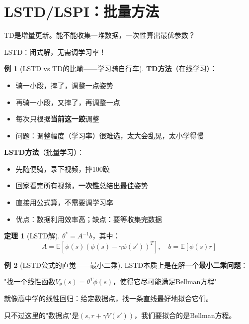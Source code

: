 \documentclass[11pt,a4paper]{article}
\theoremstyle{definition}
\newtheorem{example}{例}[section]
\newtheorem{theorem}{定理}[section]
\begin{document}
\section{LSTD/LSPI：批量方法}

\begin{plainwords}
TD是增量更新。能不能收集一堆数据，一次性算出最优参数？

LSTD：闭式解，无需调学习率！
\end{plainwords}

\begin{example}[LSTD vs TD的比喻——学习骑自行车]
\textbf{TD方法}（在线学习）：
\begin{itemize}
    \item 骑一小段，摔了，调整一点姿势
    \item 再骑一小段，又摔了，再调整一点
    \item 每次只根据\textbf{当前这一跤}调整
    \item 问题：调整幅度（学习率）很难选，太大会乱晃，太小学得慢
\end{itemize}

\textbf{LSTD方法}（批量学习）：
\begin{itemize}
    \item 先随便骑，录下视频，摔100跤
    \item 回家看完所有视频，\textbf{一次性}总结出最佳姿势
    \item 直接用公式算，不需要调学习率
    \item 优点：数据利用效率高；缺点：要等收集完数据
\end{itemize}
\end{example}

\begin{theorem}[LSTD解]
$\theta^* = A^{-1}b$，其中：
\[
A = \mathbb{E}[\phi(s)(\phi(s) - \gamma\phi(s'))^T], \quad b = \mathbb{E}[\phi(s)r]
\]
\end{theorem}

\begin{example}[LSTD公式的直觉——最小二乘]
LSTD本质上是在解一个\textbf{最小二乘问题}：

"找一个线性函数$V_\theta(s) = \theta^T \phi(s)$，使得它尽可能满足Bellman方程"

就像高中学的线性回归：给定数据点，找一条直线最好地拟合它们。

只不过这里的"数据点"是$(s, r + \gamma V(s'))$，我们要拟合的是Bellman方程。
\end{example}
\end{document}
